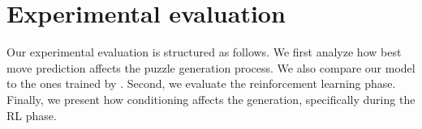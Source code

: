\documentclass[letterpaper]{article} %
\begin{document}





\section{Experimental evaluation}
\label{sec:experiments}

Our experimental evaluation is structured as follows. We first analyze how best move prediction affects the puzzle generation process. We also compare our model to the ones trained by \cite{feng2025generatingcreativechesspuzzles}. Second, we evaluate the reinforcement learning phase. Finally, we present how conditioning affects the generation, specifically during the RL phase.
\end{document}
